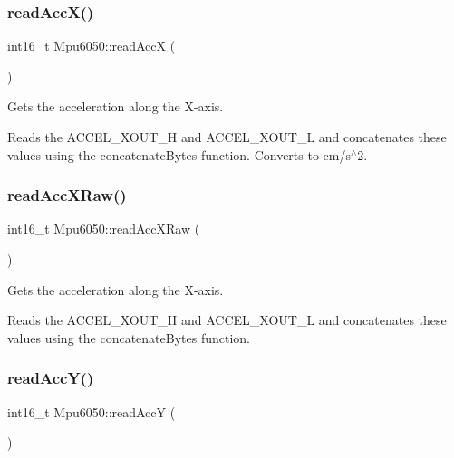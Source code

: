\subsubsection{\texorpdfstring{read\+Acc\+X()}{readAccX()}}
{\footnotesize\ttfamily int16\+\_\+t Mpu6050\+::read\+AccX (\begin{DoxyParamCaption}{ }\end{DoxyParamCaption})\hspace{0.3cm}{\ttfamily [virtual]}}



Gets the acceleration along the X-\/axis. 

Reads the A\+C\+C\+E\+L\+\_\+\+X\+O\+U\+T\+\_\+H and A\+C\+C\+E\+L\+\_\+\+X\+O\+U\+T\+\_\+L and concatenates these values using the concatenate\+Bytes function. Converts to cm/s$^\wedge$2. \mbox{\label{classMpu6050_a531fe38ae4d91c404863b594bb022ed3}} 
\subsubsection{\texorpdfstring{read\+Acc\+X\+Raw()}{readAccXRaw()}}
{\footnotesize\ttfamily int16\+\_\+t Mpu6050\+::read\+Acc\+X\+Raw (\begin{DoxyParamCaption}{ }\end{DoxyParamCaption})\hspace{0.3cm}{\ttfamily [virtual]}}



Gets the acceleration along the X-\/axis. 

Reads the A\+C\+C\+E\+L\+\_\+\+X\+O\+U\+T\+\_\+H and A\+C\+C\+E\+L\+\_\+\+X\+O\+U\+T\+\_\+L and concatenates these values using the concatenate\+Bytes function. \mbox{\label{classMpu6050_aee59cc7d2af6f37d0b559d15070069eb}} 
\subsubsection{\texorpdfstring{read\+Acc\+Y()}{readAccY()}}
{\footnotesize\ttfamily int16\+\_\+t Mpu6050\+::read\+AccY (\begin{DoxyParamCaption}{ }\end{DoxyParamCaption})\hspace{0.3cm}{\ttfamily [virtual]}}



